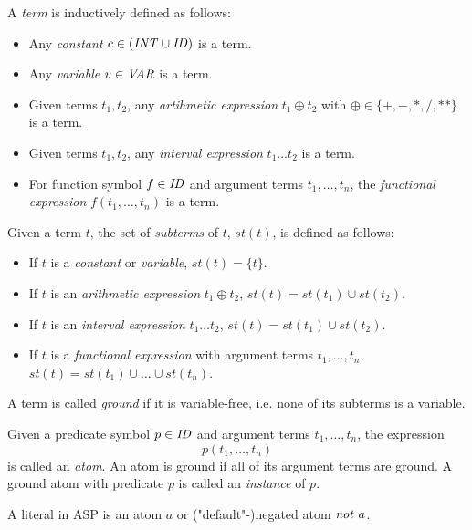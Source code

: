 \begin{definition}[Term]
\label{def:prelims-asp-syntax-term}
A \emph{term} is inductively defined as follows:
\begin{itemize}
	\item Any \emph{constant} $c \in (\mathit{INT} \cup \mathit{ID})$ is a term.
	\item Any \emph{variable} $v \in \mathit{VAR}$ is a term.
	\item Given terms $t_1, t_2$, any \emph{artihmetic expression} $t_1 \oplus t_2$ with $\oplus \in \{+, - , *, /, **\}$ is a term.
	\item Given terms $t_1, t_2$, any \emph{interval expression} $t_1 \ldots t_2$ is a term.
	\item For function symbol $f \in \mathit{ID}$ and argument terms $t_1, \ldots, t_n$, the \emph{functional expression} $f(t_1, \ldots, t_n)$ is a term.
\end{itemize}
\end{definition}

\begin{definition}[Subterms]
\label{def:prelims-asp-syntax-subterms}
Given a term $t$, the set of \emph{subterms} of $t$, $st(t)$, is defined as follows:
\begin{itemize}
	\item If $t$ is a \emph{constant} or \emph{variable}, $st(t) = \{t\}$.
	\item If $t$ is an \emph{arithmetic expression} $t_1 \oplus t_2$, $st(t) = st(t_1) \cup st(t_2)$.
	\item If $t$ is an \emph{interval expression} $t_1 \ldots t_2$, $st(t) = st(t_1) \cup st(t_2)$.
	\item If $t$ is a \emph{functional expression} with argument terms $t_1, \ldots, t_n$, $st(t) = st(t_1) \cup \ldots \cup st(t_n)$.
\end{itemize}
A term is called \emph{ground} if it is variable-free, i.e. none of its subterms is a variable.
\end{definition}

\begin{definition}[Atom]
\label{def:prelims-asp-syntax-atom}
Given a predicate symbol $p \in \mathit{ID}$ and argument terms $t_1,\ldots,t_n$, the expression
\[
	p(t_1,\ldots,t_n)
\]
is called an \emph{atom}. An atom is ground if all of its argument terms are ground. A ground atom with predicate $p$ is called an \emph{instance} of $p$.
\end{definition}

\begin{definition}[Literal]
\label{def:prelims-asp-syntax-literal}
A literal in ASP is an atom $a$ or ("default"-)negated atom $\NOT\ a$.
\end{definition}

